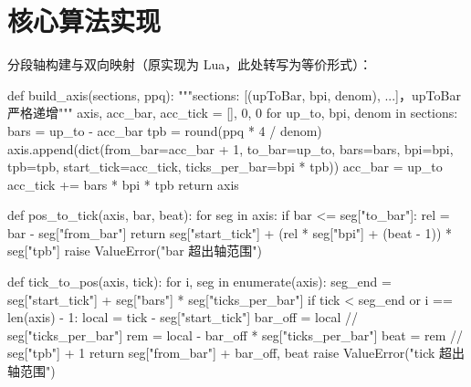 \documentclass[11pt,a4paper,fontset=none]{ctexart}
\begin{document}
\section{核心算法实现}
分段轴构建与双向映射（原实现为 Lua，此处转写为等价形式）：

\begin{museCode}[language=Python]
def build_axis(sections, ppq):
    """sections: [(upToBar, bpi, denom), ...]，upToBar 严格递增"""
    axis, acc_bar, acc_tick = [], 0, 0
    for up_to, bpi, denom in sections:
        bars = up_to - acc_bar
        tpb = round(ppq * 4 / denom)
        axis.append(dict(from_bar=acc_bar + 1, to_bar=up_to, bars=bars,
                         bpi=bpi, tpb=tpb, start_tick=acc_tick,
                         ticks_per_bar=bpi * tpb))
        acc_bar = up_to
        acc_tick += bars * bpi * tpb
    return axis

def pos_to_tick(axis, bar, beat):
    for seg in axis:
        if bar <= seg["to_bar"]:
            rel = bar - seg["from_bar"]
            return seg["start_tick"] + (rel * seg["bpi"] + (beat - 1)) * seg["tpb"]
    raise ValueError("bar 超出轴范围")

def tick_to_pos(axis, tick):
    for i, seg in enumerate(axis):
        seg_end = seg["start_tick"] + seg["bars"] * seg["ticks_per_bar"]
        if tick < seg_end or i == len(axis) - 1:
            local = tick - seg["start_tick"]
            bar_off = local // seg["ticks_per_bar"]
            rem = local - bar_off * seg["ticks_per_bar"]
            beat = rem // seg["tpb"] + 1
            return seg["from_bar"] + bar_off, beat
    raise ValueError("tick 超出轴范围")
\end{museCode}
\end{document}
